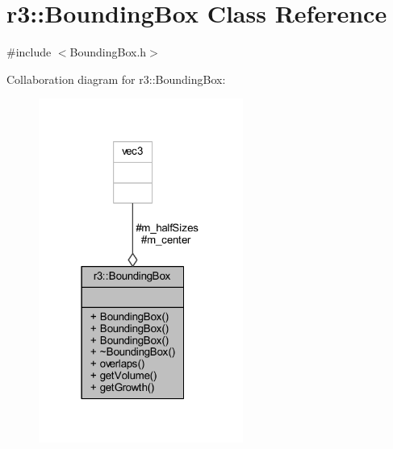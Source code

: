 \hypertarget{classr3_1_1_bounding_box}{}\section{r3\+:\+:Bounding\+Box Class Reference}
\label{classr3_1_1_bounding_box}


{\ttfamily \#include $<$Bounding\+Box.\+h$>$}



Collaboration diagram for r3\+:\+:Bounding\+Box\+:\nopagebreak
\begin{figure}[H]
\begin{center}
\leavevmode
\includegraphics[width=190pt]{classr3_1_1_bounding_box__coll__graph}
\end{center}
\end{figure}
